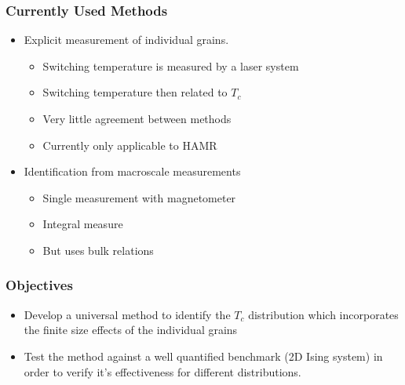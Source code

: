 \documentclass{beamer}
\begin{document}
\begin{frame}
	\frametitle{Currently Used Methods}
	\vspace{4mm}
	\begin{itemize}
		\item{Explicit measurement of individual grains.\footnotemark[3]}
		\begin{itemize}
			\item{Switching temperature is measured by a laser system} \item{Switching temperature then related to $T_c$}
			\item{Very little agreement between methods}
			\item{Currently only applicable to HAMR}
		\end{itemize}
		\vspace{4mm}
		\item{Identification from macroscale measurements\footnotemark[4]}
		\begin{itemize}
			\item{Single measurement with magnetometer}
			\item{Integral measure}
			\item{But uses bulk relations}
		\end{itemize}
	\end{itemize}
\end{frame}

\begin{frame}
	\frametitle{Objectives}
	\begin{itemize}
		\item{Develop a universal method to identify the $T_c$ distribution which incorporates the finite size effects of the individual grains\newline}
		\item{Test the method against a well quantified benchmark (2D Ising system) in order to verify it's effectiveness for different distributions.\newline}
	\end{itemize}
\end{frame}
\end{document}
